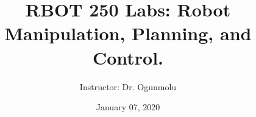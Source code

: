 \documentclass[utf8x,hyperref={pagebackref=true,citecolor=green,bookmarks=true,pdfpagelabels=false}]{beamer} %
\title{\small RBOT 250 Labs: Robot Manipulation, Planning, and Control.
}
\author{Instructor: Dr. Ogunmolu}
\institute{
	\vspace{0.5em}
	Rabb Graduate School of Continuing Studies \\
	Brandeis University, Waltham, MA 
}
\date{January 07, 2020}
\begin{document}
\frame{\titlepage
}



%
%
%
%
%
%


{
\tiny

}
\end{document}
